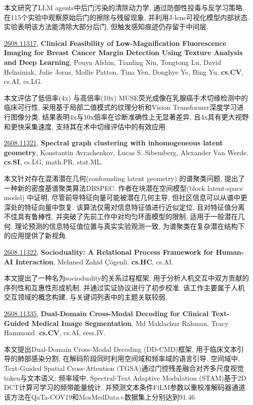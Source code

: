 \documentclass[9pt, a4paper]{article}
\theoremstyle{plain}
\theoremstyle{definition}
\theoremstyle{remark}
\newcommand{\arxivwithtarget}[3]{\hypertarget{#1}{}\href{https://arxiv.org/abs/#1}{#1}, \textbf{\textcolor{arxivblue}{#2}}, #3. }
\begin{document}
本文研究了LLM agents中后门污染的清除动力学, 通过防御性投毒与反学习策略, 在115个实验中观察原始后门的擦除与残留现象, 并利用J-lens可视化模型内部状态. 实验表明该方法能清除大部分后门, 但触发感知痕迹仍存留于中间层.


\arxivwithtarget{2608.11317}{Clinical Feasibility of Low-Magnification Fluorescence Imaging for Breast Cancer Margin Detection Using Texture Analysis and Deep Learning}{Pouya Afshin, Tianling Niu, Tongtong Lu, David Helminiak, Julie Jorns, Mollie Patton, Tina Yen, Donghye Ye, Bing Yu}\textbf{cs.CV}, cs.AI, cs.LG.

本文评估了低倍率(4x) 与高倍率(10x) MUSE荧光成像在乳腺癌手术切缘检测中的临床可行性, 采用基于局部二值模式的纹理分析和Vision Transformer深度学习进行图像分类. 结果表明4x与10x倍率在诊断准确性上无显著差异, 且4x具有更大视野和更快采集速度, 支持其在术中切缘评估中的有效应用.


\arxivwithtarget{2608.11321}{Spectral graph clustering with inhomogeneous latent geometry}{Konstantin Avrachenkov, Lucas S. Sibemberg, Alexander Van Werde}\textbf{cs.SI}, cs.LG, math.PR, stat.ML.

本文针对存在混淆潜在几何(confounding latent geometry) 的谱聚类问题, 提出了一种新的密度基谱聚类算法DBSPEC. 作者在块潜在空间模型(block latent-space model) 中证明, 尽管前导特征向量可能被潜在几何主导, 但社区信息可以从谱中更深处的特征向量中恢复. 该算法仅需对信息特征值进行近似定位, 且对特征值分离不佳具有鲁棒性, 并突破了先前工作中对均匀环面模型的限制, 适用于一般潜在几何. 理论预测的信息特征值位置与真实实验观测一致, 为谱聚类在复杂潜在结构下的应用提供了新视角.


\arxivwithtarget{2608.11322}{Socioduality: A Relational Process Framework for Human-AI Interaction}{Mehmed Zahid Çögenli}\textbf{cs.HC}, cs.AI.

本文提出了一种名为socioduality的关系过程框架, 用于分析人机交互中双方贡献的序列性和互惠性形成机制, 并通过实证协议进行了初步校准. 该工作主要属于人机交互领域的概念构建, 与关键词列表中的主题关联较弱.


\arxivwithtarget{2608.11335}{Dual-Domain Cross-Modal Decoding for Clinical Text-Guided Medical Image Segmentation}{Md Maklachur Rahman, Tracy Hammond}\textbf{cs.CV}, cs.AI, eess.IV.

本文提出Dual-Domain Cross-Modal Decoding (DD-CMD)框架, 用于临床文本引导的肺部感染分割, 在解码阶段同时利用空间域和频率域的语言引导. 空间域中, Text-Guided Spatial Cross-Attention (TGSA)通过门控残差融合对齐多尺度视觉token与文本语义; 频率域中, Spectral-Text Adaptive Modulation (STAM)基于2D DCT计算可学习的频带能量统计, 并预测文本条件FiLM参数以重校准解码器通道. 该方法在QaTa-COV19和MosMedData+数据集上分别达到91.46%
\end{document}
